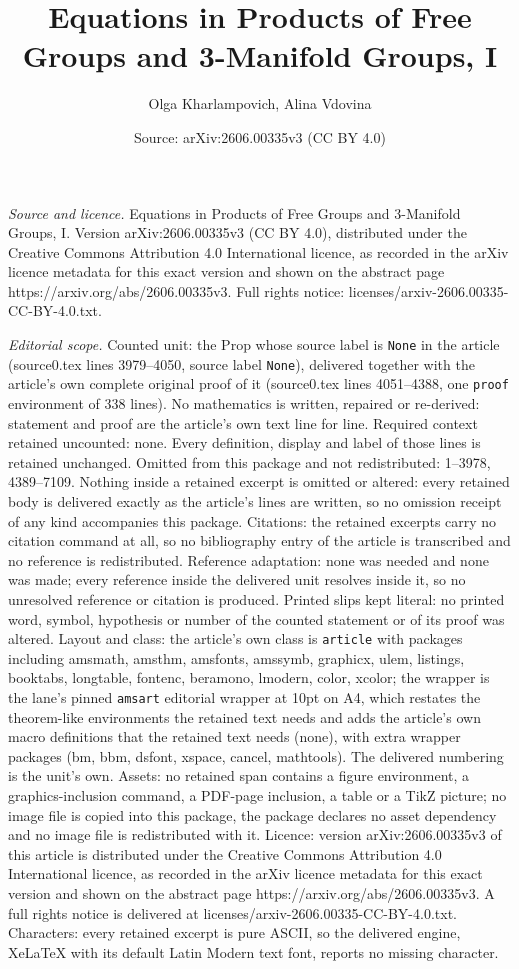 \documentclass[10pt,a4paper]{amsart}
\title[Equations in Products of Free Groups and 3-Manifold Groups, ]{Equations in Products of Free Groups and 3-Manifold Groups, I}
\author{Olga Kharlampovich, Alina Vdovina}
\date{Source: arXiv:2606.00335v3 (CC BY 4.0)}
\begin{document}
\maketitle

\noindent\emph{Source and licence.} Equations in Products of Free Groups and 3-Manifold Groups, I. Version arXiv:2606.00335v3 (CC BY 4.0), distributed under the Creative Commons Attribution 4.0 International licence, as recorded in the arXiv licence metadata for this exact version and shown on the abstract page https://arxiv.org/abs/2606.00335v3. Full rights notice: licenses/arxiv-2606.00335-CC-BY-4.0.txt.\par\smallskip

\noindent\textit{Editorial scope.} Counted unit: the Prop whose source label is \texttt{None} in the article (source0.tex lines 3979--4050, source label \texttt{None}), delivered together with the article's own complete original proof of it (source0.tex lines 4051--4388, one \texttt{proof} environment of 338 lines). No mathematics is written, repaired or re-derived: statement and proof are the article's own text line for line. Required context retained uncounted: none. Every definition, display and label of those lines is retained unchanged. Omitted from this package and not redistributed: 1--3978, 4389--7109. Nothing inside a retained excerpt is omitted or altered: every retained body is delivered exactly as the article's lines are written, so no omission receipt of any kind accompanies this package. Citations: the retained excerpts carry no citation command at all, so no bibliography entry of the article is transcribed and no reference is redistributed. Reference adaptation: none was needed and none was made; every reference inside the delivered unit resolves inside it, so no unresolved reference or citation is produced. Printed slips kept literal: no printed word, symbol, hypothesis or number of the counted statement or of its proof was altered. Layout and class: the article's own class is \texttt{article} with packages including amsmath, amsthm, amsfonts, amssymb, graphicx, ulem, listings, booktabs, longtable, fontenc, beramono, lmodern, color, xcolor; the wrapper is the lane's pinned \texttt{amsart} editorial wrapper at 10pt on A4, which restates the theorem-like environments the retained text needs and adds the article's own macro definitions that the retained text needs (none), with extra wrapper packages (bm, bbm, dsfont, xspace, cancel, mathtools). The delivered numbering is the unit's own. Assets: no retained span contains a figure environment, a graphics-inclusion command, a PDF-page inclusion, a table or a TikZ picture; no image file is copied into this package, the package declares no asset dependency and no image file is redistributed with it. Licence: version arXiv:2606.00335v3 of this article is distributed under the Creative Commons Attribution 4.0 International licence, as recorded in the arXiv licence metadata for this exact version and shown on the abstract page https://arxiv.org/abs/2606.00335v3. A full rights notice is delivered at licenses/arxiv-2606.00335-CC-BY-4.0.txt. Characters: every retained excerpt is pure ASCII, so the delivered engine, XeLaTeX with its default Latin Modern text font, reports no missing character.
\end{document}
